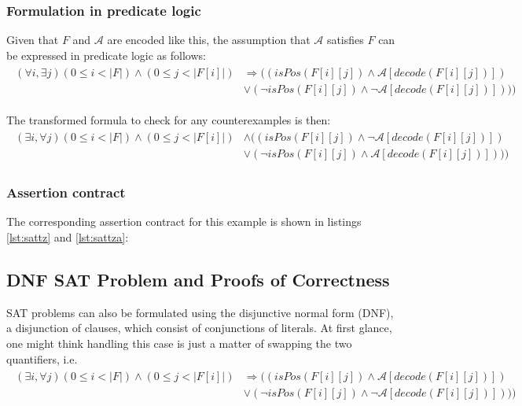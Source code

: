 \documentclass{article}
\begin{document}
\subsubsection{Formulation in predicate logic}
Given that $F$ and $\mathcal{A}$ are encoded like this, the assumption that $\mathcal{A}$ satisfies $F$ can be expressed in predicate logic as follows:
\begin{gather*}\label{eq:cnf_sat_formal}
\begin{aligned}
(\forall i, \exists j) (0 \leq i < |F|) \wedge (0 \leq j < |F[i]|) &\Rightarrow ((isPos(F[i][j]) \wedge \mathcal{A}[decode(F[i][j])]) \\
&\vee (\neg isPos(F[i][j]) \wedge \neg \mathcal{A}[decode(F[i][j])])))
\end{aligned}
\end{gather*}

The transformed formula to check for any counterexamples is then:
\begin{gather*}\label{eq:cnf_sat_formal}
\begin{aligned}
(\exists i, \forall j) (0 \leq i < |F|) \wedge (0 \leq j < |F[i]|) &\wedge ((isPos(F[i][j]) \wedge \neg \mathcal{A}[decode(F[i][j])]) \\
&\vee (\neg isPos(F[i][j]) \wedge \mathcal{A}[decode(F[i][j])])))
\end{aligned}
\end{gather*}

\subsubsection{Assertion contract}
The corresponding assertion contract for this example is shown in listings \ref{lst:sattz} and \ref{lst:sattza}:



\subsection{DNF SAT Problem and Proofs of Correctness}
SAT problems can also be formulated using the disjunctive normal form (DNF), a disjunction of clauses, which consist of conjunctions of literals. At first glance, one might think handling this case is just a matter of swapping the two quantifiers, i.e.
\begin{gather*}\label{eq:dnf_sat_formal}
\begin{aligned}
(\exists i, \forall j) (0 \leq i < |F|) \wedge (0 \leq j < |F[i]|) &\Rightarrow ((isPos(F[i][j]) \wedge \mathcal{A}[decode(F[i][j])]) \\
&\vee (\neg isPos(F[i][j]) \wedge \neg \mathcal{A}[decode(F[i][j])])))
\end{aligned}
\end{gather*}
\end{document}
